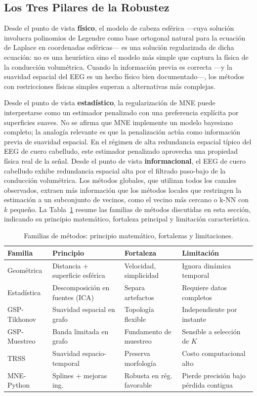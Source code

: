 \subsection{Los Tres Pilares de la Robustez}

Desde el punto de vista \textbf{físico}, el modelo de cabeza esférica ---cuya solución involucra polinomios de Legendre como base ortogonal natural para la ecuación de Laplace en coordenadas esféricas--- es una solución regularizada de dicha ecuación: no es una heurística sino el modelo más simple que captura la física de la conducción volumétrica. Cuando la información previa es correcta ---y la suavidad espacial del EEG es un hecho físico bien documentado---, los métodos con restricciones físicas simples superan a alternativas más complejas.

Desde el punto de vista \textbf{estadístico}, la regularización de MNE puede interpretarse como un estimador penalizado con una preferencia explícita por superficies suaves. No se afirma que MNE implemente un modelo bayesiano completo; la analogía relevante es que la penalización actúa como información previa de suavidad espacial. En el régimen de alta redundancia espacial típico del EEG de cuero cabelludo, este estimador penalizado aprovecha una propiedad física real de la señal.
Desde el punto de vista \textbf{informacional}, el EEG de cuero cabelludo exhibe redundancia espacial alta por el filtrado paso-bajo de la conducción volumétrica. Los métodos globales, que utilizan todos los canales observados, extraen más información que los métodos locales que restringen la estimación a un subconjunto de vecinos, como el vecino más cercano o k-NN con $k$ pequeño.
La Tabla~\ref{tab:method_families} resume las familias de métodos discutidas en esta sección, indicando su principio matemático, fortaleza principal y limitación característica.

\begin{table}[htbp]
\centering
\caption{Familias de métodos: principio matemático, fortalezas y limitaciones.}
\label{tab:method_families}
\small
\begin{tabular}{@{}p{2.2cm}p{3.0cm}p{3.1cm}p{3.2cm}@{}}
\toprule
Familia & Principio & Fortaleza & Limitación \\
\midrule
Geométrica & Distancia + superficie esférica & Velocidad, simplicidad & Ignora dinámica temporal \\
Estadística & Descomposición en fuentes (ICA) & Separa artefactos & Requiere datos completos \\
GSP-Tikhonov & Suavidad espacial en grafo & Topología flexible & Independiente por instante \\
GSP-Muestreo & Banda limitada en grafo & Fundamento de muestreo & Sensible a selección de $K$ \\
TRSS & Suavidad espacio-temporal & Preserva morfología & Costo computacional alto \\
MNE-Python & Splines + mejoras ing. & Robusta en rég. favorable & Pierde precisión bajo pérdida contigua \\
\bottomrule
\end{tabular}
\end{table}